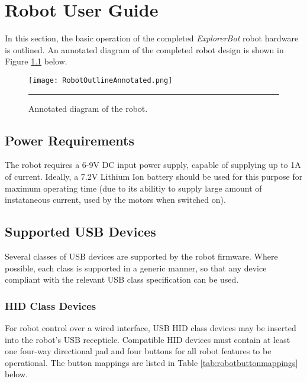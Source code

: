 \chapter{Robot User Guide}
\label{app:robotuserguide}

In this section, the basic operation of the completed \textit{ExplorerBot} robot hardware is outlined. An annotated diagram of the completed robot design is shown in Figure \ref{fig:robotoutlineannotated} below.

\begin{figure}[H]
	\centering
		\texttt{[image: RobotOutlineAnnotated.png]}
	\rule{35em}{0.5pt}
	\caption[Annotated diagram of the robot]{Annotated diagram of the robot.}
	\label{fig:robotoutlineannotated}
\end{figure}

\section{Power Requirements}

The robot requires a 6-9V DC input power supply, capable of supplying up to 1A of current. Ideally, a 7.2V Lithium Ion battery should be used for this purpose for maximum operating time (due to its abilitiy to supply large amount of instataneous current, used by the motors when switched on).

\section{Supported USB Devices}

Several classes of USB devices are supported by the robot firmware. Where possible, each class is supported in a generic manner, so that any device compliant with the relevant USB class specification can be used.

\subsection{HID Class Devices}

For robot control over a wired interface, USB HID class devices may be inserted into the robot's USB recepticle. Compatible HID devices must contain at least one four-way directional pad and four buttons for all robot features to be operational. The button mappings are listed in Table \ref{tab:robotbuttonmappings} below.

